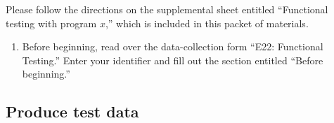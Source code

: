 
Please follow the directions on the supplemental sheet entitled 
``Functional testing with program $x$,'' which is included in this
packet of materials. 

\begin{enumerate}

\item Before beginning, read over the data-collection form 
``E22: Functional Testing.'' 
Enter your identifier and fill out the section entitled ``Before beginning.''

\end{enumerate}

\subsection*{Produce test data}

